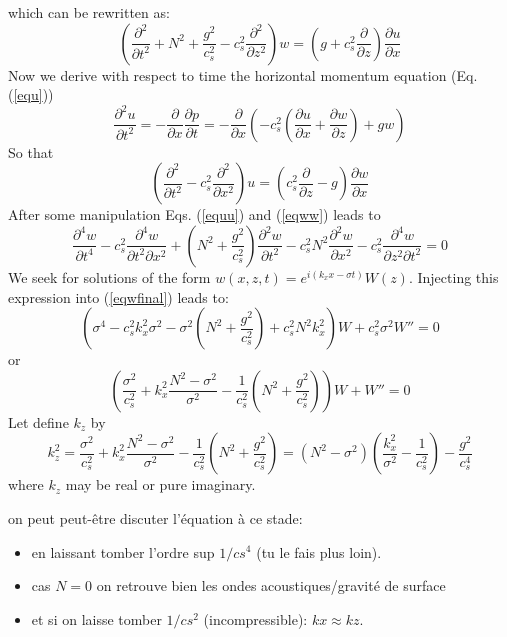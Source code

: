 \documentclass[a4paper]{article}
\numberwithin{equation}{section}
\begin{document}
which can be rewritten as:
\begin{equation}
\left(
\frac{\partial^2}{\partial t^2}+N^2+\frac{g^2}{c_s^2}-c_s^2\frac{\partial^2}{\partial z^2}
\right)
w
=\left(g+c_s^2\frac{\partial}{\partial z}\right)\frac{\partial u}{\partial x}
\label{eqww}
\end{equation}
Now we derive with respect to time the horizontal momentum equation (Eq. (\ref{equ}))
\[
\frac{\partial^2 u}{\partial t^2}=-\frac{\partial}{\partial x}\frac{\partial p}{\partial t}=-\frac{\partial}{\partial x}
\left(
-c_s^2\left(
\displaystyle \frac{\partial u}{\partial x}+\frac{\partial w}{\partial z}
\right)+gw
\right)
\]
So that
\begin{equation}
\left(
\frac{\partial^2 }{\partial t^2}-c_s^2\frac{\partial^2}{\partial x^2}
\right)u
=
\left(
c_s^2\frac{\partial}{\partial z}-g
\right)\frac{\partial w}{\partial x}
\label{equu}
\end{equation}
After some manipulation Eqs. (\ref{equu}) and (\ref{eqww}) leads to
\begin{equation}
\frac{\partial^4 w}{\partial t^4}-c_s^2\frac{\partial^4 w}{\partial t^2\partial x^2}
+\left(N^2+\frac{g^2}{c_s^2}\right)\frac{\partial^2 w}{\partial t^2}-c_s^2N^2\frac{\partial^2w}{\partial x^2}-c_s^2\frac{\partial^4w}{\partial z^2\partial t^2}
=
0
\label{eqwfinal}
\end{equation}
We seek for solutions of the form $w(x,z,t)=e^{i(k_xx-\sigma t)}W(z)$. Injecting this expression into (\ref{eqwfinal}) leads to:
\[
\left(\sigma^4-c_s^2k_x^2\sigma^2-\sigma^2\left(
N^2+\frac{g^2}{c_s^2}
\right)
+c_s^2N^2k_x^2
\right)
W
+c_s^2\sigma^2W''=0
\]
or
\begin{equation}
\left(\frac{\sigma^2}{c_s^2}
+k_x^2
\frac{N^2-\sigma^2}{\sigma^2}
-\frac{1}{c_s^2}\left(
N^2+\frac{g^2}{c_s^2}
\right)
\right)
W
+W''=0
\label{eqdefw}
\end{equation}
Let define $k_z$ by
\begin{equation}
k_z^2=
\frac{\sigma^2}{c_s^2}
+k_x^2
\frac{N^2-\sigma^2}{\sigma^2}
-\frac{1}{c_s^2}\left(
N^2+\frac{g^2}{c_s^2}
\right)
=\left(
N^2-\sigma^2
\right)
\left(
\frac{k_x^2}{\sigma^2}-\frac{1}{c_s^2}
\right)
-\frac{g^2}{c_s^4}
\label{defkz}
\end{equation}
where $k_z$ may be real or pure imaginary.

\color{blue} on peut peut-être discuter l'équation à ce stade:
\begin{itemize}
\item en laissant tomber l'ordre sup $1/cs^4$ (tu le fais plus loin). 
\item cas $N=0$ on retrouve bien les ondes acoustiques/gravité de surface
\item et si on laisse tomber $1/cs^2$ (incompressible): $kx \approx kz.$
\end{itemize}
\color{black}
\end{document}

